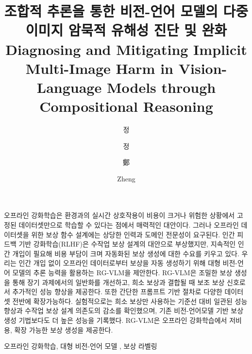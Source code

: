 \documentclass[master,english,final]{kaist-ucs}
\title[korean] {조합적 추론을 통한 비전-언어 모델의 다중 이미지 암묵적 유해성 진단 및 완화}
\title[english]{Diagnosing and Mitigating Implicit Multi-Image Harm in Vision-Language Models through Compositional Reasoning}
\author[korean]{정}{욱 연}
\author[korean2]{정}{욱연}    %
\author[chinese]{鄭}{旭 然}
\author[english]{Zheng}{Xuran}
\begin{document}

   \thesisinfo
    \begin{summary}           
    오프라인 강화학습은 환경과의 실시간 상호작용이 비용이 크거나 위험한 상황에서 고정된 데이터셋만으로 학습할 수 있다는 점에서 매력적인 대안이다. 그러나 오프라인 데이터셋을 위한 보상 함수 설계에는 상당한 인력과 도메인 전문성이 요구된다. 인간 피드백 기반 강화학습(RLHF)은 수작업 보상 설계의 대안으로 부상했지만, 지속적인 인간 개입이 필요해 비용 부담이 크며 자동화된 보상 생성에 대한 수요를 키우고 있다. 우리는 인간 개입 없이 오프라인 데이터로부터 보상을 자동 생성하기 위해 대형 비전-언어 모델의 추론 능력을 활용하는 RG-VLM을 제안한다. RG-VLM은 조밀한 보상 생성을 통해 장기 과제에서의 일반화를 개선하고, 희소 보상과 결합될 때 보조 보상 신호로서 추가적인 성능 향상을 제공한다. 또한 간단한 프롬프트 기반 절차로 다양한 데이터셋 전반에 확장가능하다. 실험적으로는 희소 보상만 사용하는 기준선 대비 일관된 성능 향상과 수작업 보상 설계 의존도의 감소를 확인했으며, 기존 비전-언어모델 기반 보상 생성 기법보다도 더 높은 성능을 기록했다. RG-VLM은 오프라인 강화학습에서 저비용, 확장 가능한 보상 생성을 제공한다. 
    \end{summary}
   
    \begin{Korkeyword}
    오프라인 강화학습, 대형 비전-언어 모델 , 보상 라벨링
    \end{Korkeyword}
\end{document}
